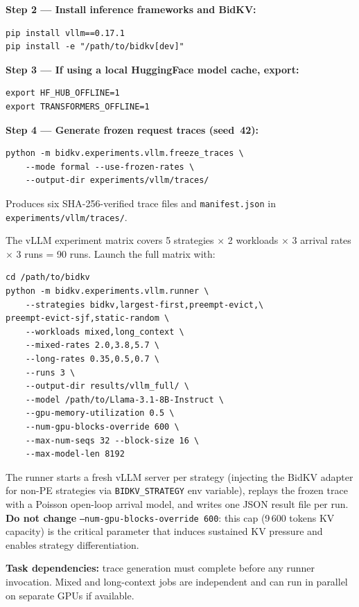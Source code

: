 \documentclass[conference]{IEEEtran}
\begin{document}
\textbf{Step 2 --- Install inference frameworks and BidKV:}
\begingroup\footnotesize\begin{verbatim}
pip install vllm==0.17.1
pip install -e "/path/to/bidkv[dev]"
\end{verbatim}
\endgroup

\textbf{Step 3 --- If using a local HuggingFace model cache, export:}
\begingroup\footnotesize\begin{verbatim}
export HF_HUB_OFFLINE=1
export TRANSFORMERS_OFFLINE=1
\end{verbatim}
\endgroup

\textbf{Step 4 --- Generate frozen request traces (seed~42):}
\begingroup\footnotesize\begin{verbatim}
python -m bidkv.experiments.vllm.freeze_traces \
    --mode formal --use-frozen-rates \
    --output-dir experiments/vllm/traces/
\end{verbatim}
\endgroup
Produces six SHA-256-verified trace files and
\texttt{manifest.json} in \texttt{experiments/vllm/traces/}.

\artcomp

The vLLM experiment matrix covers 5 strategies $\times$ 2 workloads
$\times$ 3 arrival rates $\times$ 3 runs = 90 runs.
Launch the full matrix with:

\begingroup\footnotesize\begin{verbatim}
cd /path/to/bidkv
python -m bidkv.experiments.vllm.runner \
    --strategies bidkv,largest-first,preempt-evict,\
preempt-evict-sjf,static-random \
    --workloads mixed,long_context \
    --mixed-rates 2.0,3.8,5.7 \
    --long-rates 0.35,0.5,0.7 \
    --runs 3 \
    --output-dir results/vllm_full/ \
    --model /path/to/Llama-3.1-8B-Instruct \
    --gpu-memory-utilization 0.5 \
    --num-gpu-blocks-override 600 \
    --max-num-seqs 32 --block-size 16 \
    --max-model-len 8192
\end{verbatim}
\endgroup

The runner starts a fresh vLLM server per strategy (injecting
the BidKV adapter for non-PE strategies via
\texttt{BIDKV\_STRATEGY} env variable), replays the frozen trace
with a Poisson open-loop arrival model, and writes one JSON result
file per run.
\textbf{Do not change} \texttt{--num-gpu-blocks-override 600}:
this cap (9\,600 tokens KV capacity) is the critical parameter
that induces sustained KV pressure and enables strategy
differentiation.

\textbf{Task dependencies:} trace generation must complete before
any runner invocation.
Mixed and long-context jobs are independent and can run in
parallel on separate GPUs if available.
\end{document}

